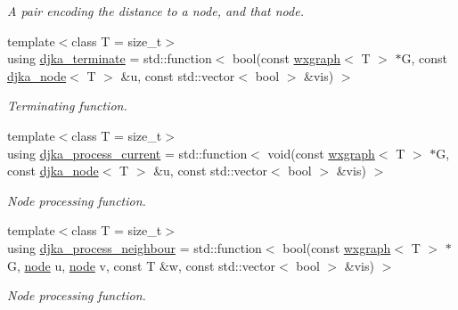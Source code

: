 \begin{DoxyCompactItemize}
\begin{DoxyCompactList}\small\item\em A pair encoding the distance to a node, and that node. \end{DoxyCompactList}\item 
{\footnotesize template$<$class T  = size\-\_\-t$>$ }\\using \hyperlink{namespacelgraph_1_1traversal_1_1dijkstra_ac9bfbfba77a9969151df891b207d078c}{djka\-\_\-terminate} = std\-::function$<$ bool(const \hyperlink{classlgraph_1_1wxgraph}{wxgraph}$<$ T $>$ $\ast$G, const \hyperlink{namespacelgraph_1_1traversal_1_1dijkstra_ab54520d6f8049c8841128742624904a3}{djka\-\_\-node}$<$ T $>$ \&u, const std\-::vector$<$ bool $>$ \&vis) $>$
\begin{DoxyCompactList}\small\item\em Terminating function. \end{DoxyCompactList}\item 
{\footnotesize template$<$class T  = size\-\_\-t$>$ }\\using \hyperlink{namespacelgraph_1_1traversal_1_1dijkstra_a6fd2792dd3d21438c17adc0187e99f66}{djka\-\_\-process\-\_\-current} = std\-::function$<$ void(const \hyperlink{classlgraph_1_1wxgraph}{wxgraph}$<$ T $>$ $\ast$G, const \hyperlink{namespacelgraph_1_1traversal_1_1dijkstra_ab54520d6f8049c8841128742624904a3}{djka\-\_\-node}$<$ T $>$ \&u, const std\-::vector$<$ bool $>$ \&vis) $>$
\begin{DoxyCompactList}\small\item\em Node processing function. \end{DoxyCompactList}\item 
{\footnotesize template$<$class T  = size\-\_\-t$>$ }\\using \hyperlink{namespacelgraph_1_1traversal_1_1dijkstra_a5e5d24edba3465d838a24b322a9d2a56}{djka\-\_\-process\-\_\-neighbour} = std\-::function$<$ bool(const \hyperlink{classlgraph_1_1wxgraph}{wxgraph}$<$ T $>$ $\ast$G, \hyperlink{namespacelgraph_a397169dd66adf725210a30fb7251773e}{node} u, \hyperlink{namespacelgraph_a397169dd66adf725210a30fb7251773e}{node} v, const T \&w, const std\-::vector$<$ bool $>$ \&vis) $>$
\begin{DoxyCompactList}\small\item\em Node processing function. \end{DoxyCompactList}\end{DoxyCompactItemize}
